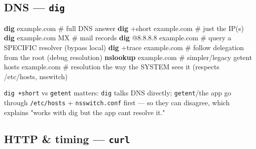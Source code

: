 \documentclass[11pt]{article}
\newenvironment{Shaded}{\begin{snugshade}}{\end{snugshade}}
\newcommand{\CommentTok}[1]{\textcolor[rgb]{0.48,0.49,0.49}{#1}}
\newcommand{\ExtensionTok}[1]{\textcolor[rgb]{0.00,0.60,1.00}{\textbf{#1}}}
\newcommand{\FunctionTok}[1]{\textcolor[rgb]{0.56,0.27,0.68}{#1}}
\newcommand{\NormalTok}[1]{\textcolor[rgb]{0.81,0.81,0.76}{#1}}
\begin{document}
\subsection{\texorpdfstring{DNS --- \texttt{dig}}{DNS --- dig}}\label{dns--dig}


\begin{Shaded}
\begin{Highlighting}[]
\ExtensionTok{dig}\NormalTok{ example.com                 }\CommentTok{\# full DNS answer}
\ExtensionTok{dig}\NormalTok{ +short example.com          }\CommentTok{\# just the IP(s)}
\ExtensionTok{dig}\NormalTok{ example.com MX              }\CommentTok{\# mail records}
\ExtensionTok{dig}\NormalTok{ @8.8.8.8 example.com        }\CommentTok{\# query a SPECIFIC resolver (bypass local)}
\ExtensionTok{dig}\NormalTok{ +trace example.com          }\CommentTok{\# follow delegation from the root (debug resolution)}
\ExtensionTok{nslookup}\NormalTok{ example.com            }\CommentTok{\# simpler/legacy}
\FunctionTok{getent}\NormalTok{ hosts example.com        }\CommentTok{\# resolution the way the SYSTEM sees it (respects /etc/hosts, nsswitch)}
\end{Highlighting}
\end{Shaded}

\texttt{dig\ +short} vs \texttt{getent} matters: \texttt{dig} talks DNS directly; \texttt{getent}/the app go through \texttt{/etc/hosts} + \texttt{nsswitch.conf} first --- so they can disagree, which explains "works with dig but the app can\textquotesingle t resolve it."

\subsection{\texorpdfstring{HTTP \& timing --- \texttt{curl}}{HTTP \& timing --- curl}}\label{http--timing--curl}

\end{document}
